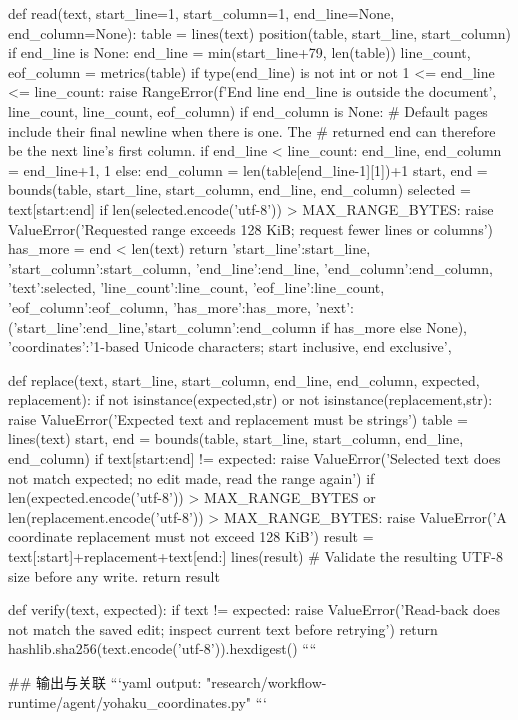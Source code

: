 def read(text, start_line=1, start_column=1, end_line=None, end_column=None):
    table = lines(text)
    position(table, start_line, start_column)
    if end_line is None:
        end_line = min(start_line+79, len(table))
    line_count, eof_column = metrics(table)
    if type(end_line) is not int or not 1 <= end_line <= line_count:
        raise RangeError(f'End line {end_line} is outside the document',
                         line_count, line_count, eof_column)
    if end_column is None:
        # Default pages include their final newline when there is one. The
        # returned end can therefore be the next line's first column.
        if end_line < line_count:
            end_line, end_column = end_line+1, 1
        else:
            end_column = len(table[end_line-1][1])+1
    start, end = bounds(table, start_line, start_column, end_line, end_column)
    selected = text[start:end]
    if len(selected.encode('utf-8')) > MAX_RANGE_BYTES:
        raise ValueError('Requested range exceeds 128 KiB; request fewer lines or columns')
    has_more = end < len(text)
    return {
        'start_line':start_line, 'start_column':start_column,
        'end_line':end_line, 'end_column':end_column, 'text':selected,
        'line_count':line_count, 'eof_line':line_count,
        'eof_column':eof_column, 'has_more':has_more,
        'next':({'start_line':end_line,'start_column':end_column} if has_more else None),
        'coordinates':'1-based Unicode characters; start inclusive, end exclusive',
    }


def replace(text, start_line, start_column, end_line, end_column, expected, replacement):
    if not isinstance(expected,str) or not isinstance(replacement,str):
        raise ValueError('Expected text and replacement must be strings')
    table = lines(text)
    start, end = bounds(table, start_line, start_column, end_line, end_column)
    if text[start:end] != expected:
        raise ValueError('Selected text does not match expected; no edit made, read the range again')
    if len(expected.encode('utf-8')) > MAX_RANGE_BYTES or len(replacement.encode('utf-8')) > MAX_RANGE_BYTES:
        raise ValueError('A coordinate replacement must not exceed 128 KiB')
    result = text[:start]+replacement+text[end:]
    lines(result)  # Validate the resulting UTF-8 size before any write.
    return result


def verify(text, expected):
    if text != expected:
        raise ValueError('Read-back does not match the saved edit; inspect current text before retrying')
    return hashlib.sha256(text.encode('utf-8')).hexdigest()
````

## 输出与关联
```yaml
output: "research/workflow-runtime/agent/yohaku_coordinates.py"
```
